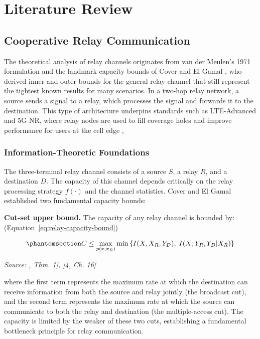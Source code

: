 \chapter{Literature Review}\label{sec:literature-review}

\section{Cooperative Relay Communication}\label{sec:cooperative-relay-communication}

 The theoretical analysis of relay channels originates from van der Meulen’s 1971 formulation and the landmark capacity bounds of Cover and El Gamal \cite{CoverGamal1979RelayChannel}, who derived inner and outer bounds for the general relay channel that still represent the tightest known results for many scenarios. In a two-hop relay network, a source sends a signal to a relay, which processes the signal and forwards it to the destination. This type of architecture underpins standards such as LTE-Advanced and 5G NR, where relay nodes are used to fill coverage holes and improve performance for users at the cell edge \cite{Laneman2004CooperativeDiversity}, \cite{Nosratinia2004CooperativeCommunication}

\subsection{Information-Theoretic Foundations}\label{sec:information-theoretic-foundations}

The three-terminal relay channel consists of a source \(S\), a relay \(R\), and a destination \(D\). The capacity of this channel depends critically on the relay processing strategy \(f(\cdot)\) and the channel statistics. Cover and El Gamal \cite{CoverGamal1979RelayChannel} established two fundamental capacity bounds:

\textbf{Cut-set upper bound.} The capacity of any relay channel is bounded by: (Equation~\ref{eq:relay-capacity-bound})

\begin{equation}\protect\phantomsection\label{eq:relay-capacity-bound}{C \leq \max_{p(x, x_R)} \min\left\{I(X, X_R; Y_D), \; I(X; Y_R, Y_D | X_R)\right\}
}\end{equation} \par{\small\textit{Source: \cite{CoverGamal1979RelayChannel}, Thm. 1], [4, Ch. 16]}}

where the first term represents the maximum rate at which the destination can receive information from both the source and relay jointly (the broadcast cut), and the second term represents the maximum rate at which the source can communicate to both the relay and destination (the multiple-access cut). The capacity is limited by the weaker of these two cuts, establishing a fundamental bottleneck principle for relay communication.

